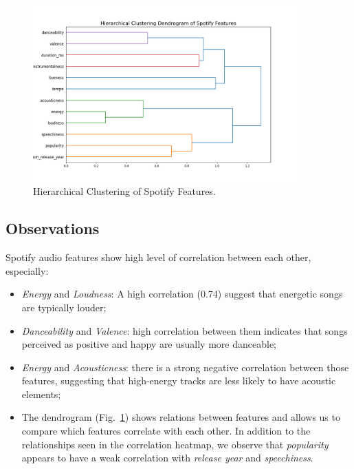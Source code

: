 \begin{center}
\begin{figure}[H]
  \centering
  \includegraphics[width=4in]{img/dendrogram_spotify_features.png}
  \caption{Hierarchical Clustering of Spotify Features.}
  \label{Figure:dendrogram_spotify_features}
\end{figure}
\end{center}

\subsection*{Observations}
Spotify audio features show high level of correlation between each other, especially:
\begin{itemize}
  \item \textit{Energy} and \textit{Loudness}: A high correlation (0.74) suggest
    that energetic songs are typically louder;
  \item \textit{Danceability} and \textit{Valence}: high correlation between
    them indicates that songs perceived as positive and happy are usually more
    danceable;
  \item \textit{Energy} and \textit{Acousticness}: there is a strong negative
    correlation between those features, suggesting that high-energy tracks are
    less likely to have acoustic elements;
  \item The dendrogram (Fig.~\ref{Figure:dendrogram_spotify_features}) shows relations
    between features and allows us to compare which features correlate with
    each other. In addition to the relationships seen in the correlation
    heatmap, we observe that \textit{popularity} appears to have a weak
    correlation with \textit{release year} and \textit{speechiness}.

\end{itemize}


